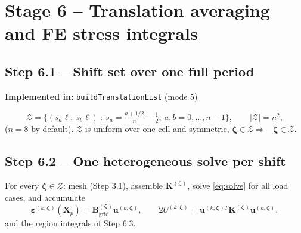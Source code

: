 \documentclass[11pt,a4paper]{article}
\newcommand{\eps}{\bm{\varepsilon}}
\newcommand{\bX}{\bm{X}}
\newcommand{\bu}{\bm{u}}
\newcommand{\bK}{\bm{K}}
\newcommand{\Zset}{\mathcal{Z}}
\newcommand{\code}[1]{\texttt{#1}}
\theoremstyle{plain}
\theoremstyle{remark}
\newcommand{\implementedin}[1]{\begin{codebox}\textbf{Implemented in:} #1\end{codebox}}
\begin{document}
\section{Stage 6 -- Translation averaging and FE stress integrals}
\label{sec:stage6}

\subsection*{Step 6.1 -- Shift set over one full period}
\implementedin{\code{buildTranslationList} (mode 5)}
\begin{equation}
  \Zset=\big\{(s_a\ell,\ s_b\ell)\ :\ s_a=\tfrac{a+1/2}{n}-\tfrac12,\ a,b=0,\dots,n-1\big\},
  \qquad|\Zset|=n^2,
  \label{eq:shifts}
\end{equation}
($n=8$ by default). $\Zset$ is uniform over one cell and symmetric, $\bm\zeta\in\Zset\Rightarrow
-\bm\zeta\in\Zset$.

\subsection*{Step 6.2 -- One heterogeneous solve per shift}
For every $\bm\zeta\in\Zset$: mesh (Step 3.1), assemble $\bK^{(\bm\zeta)}$, solve \eqref{eq:solve}
for all load cases, and accumulate
\begin{equation}
  \eps^{(k,\bm\zeta)}(\bX_p)=\bm B^{(\bm\zeta)}_{\mathrm{grid}}\bu^{(k,\bm\zeta)},\qquad
  2U^{(k,\bm\zeta)}=\bu^{(k,\bm\zeta)T}\bK^{(\bm\zeta)}\bu^{(k,\bm\zeta)},
\end{equation}
and the region integrals of Step 6.3.
\end{document}
